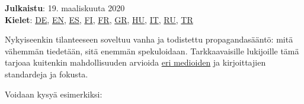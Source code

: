 \textbf{Julkaistu}: 19. maaliskuuta 2020\\
\textbf{Kielet}: \href{https://swprs.org/corona-medien-propaganda/}{DE},
\href{https://swprs.org/corona-media-propaganda/}{EN},
\href{http://piensachile.com/2020/03/corona-medios-de-comunicacion-propaganda/}{ES},
\href{https://swprs.org/koronasta-mediasta-ja-propagandasta/}{FI},
\href{https://swprs.org/sur-le-coronavirus-les-medias-et-la-propagande/}{FR},
\href{https://swprs.org/corona-media-propaganda-greek/}{GR},
\href{https://swprs.org/korona-media-propaganda/}{HU},
\href{https://swprs.org/corona-media-propaganda-it/}{IT},
\href{https://swprs.org/\%d0\%be-\%d0\%ba\%d0\%be\%d1\%80\%d0\%be\%d0\%bd\%d0\%b0\%d0\%b2\%d0\%b8\%d1\%80\%d1\%83\%d1\%81\%d0\%b5-\%d1\%81\%d0\%bc\%d0\%b8-\%d0\%b8-\%d0\%bf\%d1\%80\%d0\%be\%d0\%bf\%d0\%b0\%d0\%b3\%d0\%b0\%d0\%bd\%d0\%b4\%d0\%b5/}{RU},
\href{https://swprs.org/korona-medya-ve-propaganda-uezerine/}{TR}

Nykyiseenkin tilanteeseen soveltuu vanha ja todistettu propagandasääntö:
mitä vähemmän tiedetään, sitä enemmän spekuloidaan. Tarkkaavaisille
lukijoille tämä tarjoaa kuitenkin mahdollisuuden arvioida
\href{https://swprs.org/media-navigator/}{eri medioiden} ja
kirjoittajien standardeja ja fokusta.

Voidaan kysyä esimerkiksi:

